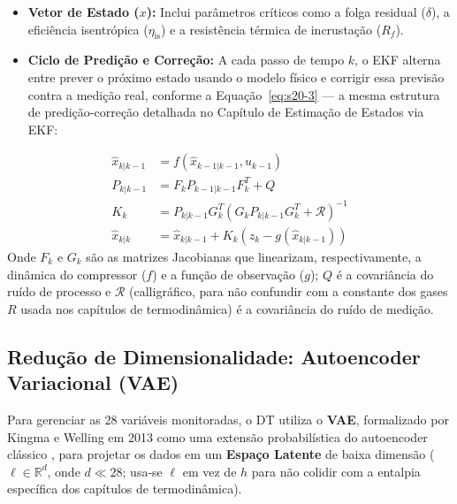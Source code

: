\documentclass[12pt,a4paper]{article}
\numberwithin{equation}{section}
\numberwithin{table}{section}
\numberwithin{figure}{section}
\begin{document}
	\begin{itemize}
		\item \textbf{Vetor de Estado ($x$):} Inclui parâmetros críticos como a folga residual ($\delta$), a eficiência isentrópica ($\eta_{\text{is}}$) e a resistência térmica de incrustação ($R_f$).
		\item \textbf{Ciclo de Predição e Correção:} A cada passo de tempo $k$, o EKF alterna entre prever o próximo estado usando o modelo físico e corrigir essa previsão contra a medição real, conforme a Equação~\eqref{eq:s20-3} — a mesma estrutura de predição-correção detalhada no Capítulo de Estimação de Estados via EKF:
	\end{itemize}
	\begin{equation}\label{eq:s20-3}
	\begin{aligned}
		\hat{x}_{k|k-1} &= f(\hat{x}_{k-1|k-1}, u_{k-1}) \\[4pt]
		P_{k|k-1} &= F_k P_{k-1|k-1} F_k^T + Q \\[4pt]
		K_k &= P_{k|k-1} G_k^T (G_k P_{k|k-1} G_k^T + \mathcal{R})^{-1} \\[4pt]
		\hat{x}_{k|k} &= \hat{x}_{k|k-1} + K_k (z_k - g(\hat{x}_{k|k-1}))
	\end{aligned}
\end{equation}
	Onde $F_k$ e $G_k$ são as matrizes Jacobianas que linearizam, respectivamente, a dinâmica do compressor ($f$) e a função de observação ($g$); $Q$ é a covariância do ruído de processo e $\mathcal{R}$ (calligráfico, para não confundir com a constante dos gases $R$ usada nos capítulos de termodinâmica) é a covariância do ruído de medição.

	\subsection{Redução de Dimensionalidade: Autoencoder Variacional (VAE)}

	Para gerenciar as 28 variáveis monitoradas, o DT utiliza o \textbf{VAE}, formalizado por Kingma e Welling em 2013 como uma extensão probabilística do autoencoder clássico \cite{vae}, para projetar os dados em um \textbf{Espaço Latente} de baixa dimensão ($\ell \in \mathbb{R}^d$, onde $d \ll 28$; usa-se $\ell$ em vez de $h$ para não colidir com a entalpia específica dos capítulos de termodinâmica).
	
\end{document}
